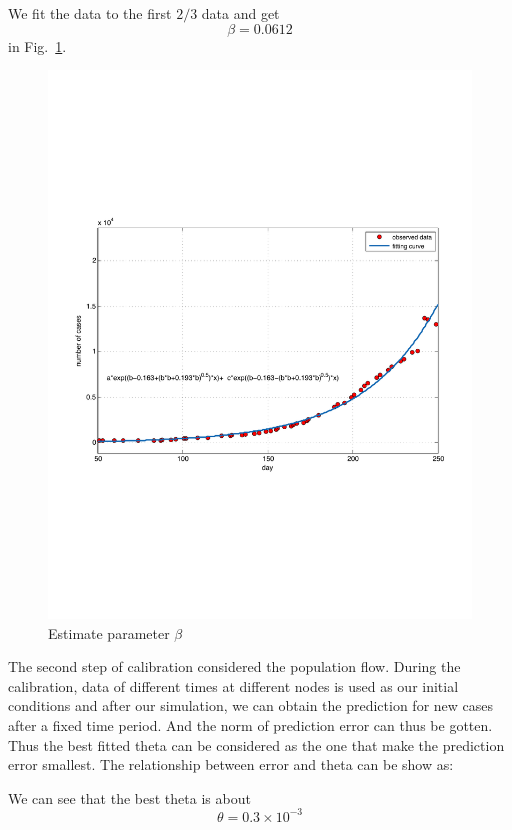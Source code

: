 \documentclass[11pt]{article}
\begin{document}
 
We fit the data to the first $2/3$ data and get $$\beta = 0.0612$$ in Fig.~\ref{cfit}.

\begin{figure}[hbt]
\begin{center}
  \includegraphics[width=5in]{graph/cfit.pdf}
  \caption{Estimate parameter $\beta$ }
  \label{cfit}
\end{center}  
\end{figure}




The second step of calibration considered the population flow. During the calibration, data of different times at different nodes is used as our initial conditions and after our simulation, we can obtain the prediction for new cases after a fixed time period. And the norm of prediction error can thus be gotten. Thus the best fitted theta can be considered as the one that make the prediction error smallest. The relationship between error and theta can be show as:

We can see that the best theta is about $$\theta = 0.3 \times 10^{-3}$$
\end{document}
